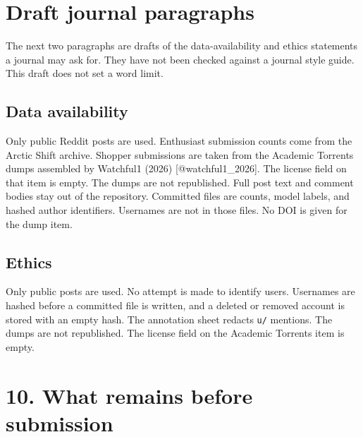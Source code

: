 \documentclass[11pt]{article}
\begin{document}
\section{Draft journal paragraphs}

The next two paragraphs are drafts of the data-availability and ethics statements a journal may ask for. They have not been checked against a journal style guide. This draft does not set a word limit.


\subsection{Data availability}

Only public Reddit posts are used. Enthusiast submission counts come from the Arctic Shift archive. Shopper submissions are taken from the Academic Torrents dumps assembled by Watchful1 (2026) [@watchful1\_2026]. The license field on that item is empty. The dumps are not republished. Full post text and comment bodies stay out of the repository. Committed files are counts, model labels, and hashed author identifiers. Usernames are not in those files. No DOI is given for the dump item.


\subsection{Ethics}

Only public posts are used. No attempt is made to identify users. Usernames are hashed before a committed file is written, and a deleted or removed account is stored with an empty hash. The annotation sheet redacts \texttt{u/} mentions. The dumps are not republished. The license field on the Academic Torrents item is empty.


\section{10. What remains before submission}
\end{document}
